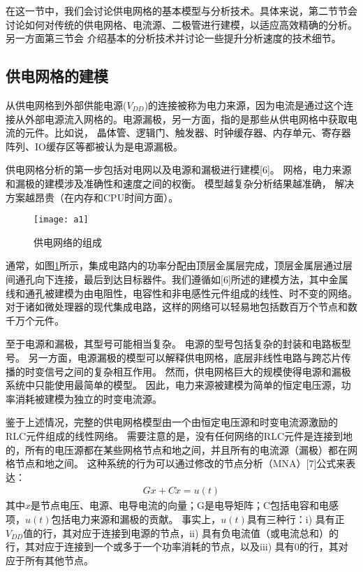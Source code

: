 在这一节中，我们会讨论供电网格的基本模型与分析技术。具体来说，第二节节会讨论如何对传统的供电网格、电流源、二极管进行建模，以适应高效精确的分析。另一方面第三节会
介绍基本的分析技术并讨论一些提升分析速度的技术细节。

\subsection{供电网格的建模}


从供电网格到外部供能电源($V_{DD}$)的连接被称为电力来源，因为电流是通过这个连接从外部电源流入网格的。电源漏极，另一方面，指的是那些从供电网格中获取电流的元件。比如说，
晶体管、逻辑门、触发器、时钟缓存器、内存单元、寄存器阵列、IO缓存区等都被认为是电源漏极。

供电网格分析的第一步包括对电网以及电源和漏极进行建模[6]。 网格，电力来源和漏极的建模涉及准确性和速度之间的权衡。 模型越复杂分析结果越准确，
解决方案越昂贵（在内存和CPU时间方面）。

\begin{figure}[H] %
  \centering
  \texttt{[image: a1]}
  \caption{供电网络的组成}
  \label{fig:a1}
\end{figure}

通常，如图\ref{fig:a1}所示，集成电路内的功率分配由顶层金属层完成，顶层金属层通过层间通孔向下连接，最后到达目标器件。我们遵循如[6]所述的建模方法，其中金属线和通孔被建模为由电阻性，电容性和非电感性元件组成的线性、时不变的网络。 对于诸如微处理器的现代集成电路，这样的网络可以轻易地包括数百万个节点和数千万个元件。

至于电源和漏极，其型号可能相当复杂。 电源的型号包括复杂的封装和电路板型号。 另一方面，电源漏极的模型可以解释供电网格，底层非线性电路与跨芯片传播的时变信号之间的复杂相互作用。 然而，供电网格巨大的规模使得电源和漏极系统中只能使用最简单的模型。 因此，电力来源被建模为简单的恒定电压源，功率消耗被建模为独立的时变电流源。

鉴于上述情况，完整的供电网格模型由一个由恒定电压源和时变电流源激励的RLC元件组成的线性网络。 需要注意的是，没有任何网络的RLC元件是连接到地的，所有的电压源都在某些网格节点和地之间，并且所有的电流源（漏极）都在网格节点和地之间。 这种系统的行为可以通过修改的节点分析（MNA）[7]公式来表达：
\begin{align}
Gx+C\dot{x}=u(t)
\label{eq:eq1}
\end{align}
其中$x$是节点电压、电源、电导电流的向量；G是电导矩阵；C包括电容和电感项，$u(t)$包括电力来源和漏极的贡献。 事实上，$u(t)$具有三种行：i) 具有正$V_{DD}$值的行，其对应于连接到电源的节点，ii) 具有负电流值（或电流总和）的行，其对应于连接到一个或多于一个功率消耗的节点，以及iii) 具有0的行，其对应于所有其他节点。

